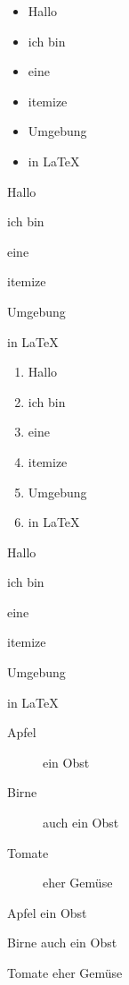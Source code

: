 \documentclass[12pt,ngerman,parskip=half]{scrreprt} %
\begin{document}
\begin{itemize}
	\item Hallo
	\item ich bin
	\item eine 
	\item itemize
	\item Umgebung
	\item in LaTeX
\end{itemize}

\begin{compactitem}[\textcolor{red}{$\Rightarrow$}]
	\item Hallo
	\item ich bin
	\item eine 
	\item itemize
	\item Umgebung
	\item in LaTeX
\end{compactitem}

\begin{enumerate}
	\item Hallo
	\item ich bin
	\item eine 
	\item itemize 
	\item Umgebung
	\item in LaTeX
\end{enumerate}

\begin{compactenum}[1.] \setcounter{enumi}{2} 
	\item Hallo
	\item ich bin
	\item eine 
	\item itemize 
	\item Umgebung
	\item in LaTeX
\end{compactenum}

\begin{description}
\item[Apfel] ein Obst
\item[Birne] auch ein Obst
\item[Tomate] eher Gemüse
\end{description}

\begin{compactdesc}
\item[Apfel] ein Obst
\item[Birne] auch ein Obst
\item[Tomate] eher Gemüse
\end{compactdesc}
\end{document}
